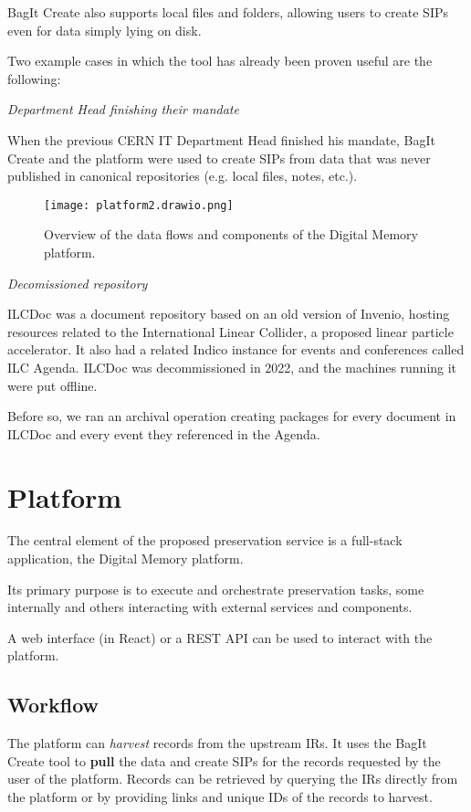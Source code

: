 \documentclass[11pt]{IEEEtran}
\begin{document}
BagIt Create also supports local files and folders, allowing users to create SIPs even for data simply lying on disk.

Two example cases in which the tool has already been proven useful are the following:

\par{\textit{Department Head finishing their mandate}}

When the previous CERN IT Department Head finished his mandate, BagIt Create and the platform were used to create SIPs from data that was never published in canonical repositories (e.g. local files, notes, etc.).

\begin{figure*}
    \texttt{[image: platform2.drawio.png]}
    \caption{Overview of the data flows and components of the Digital Memory platform.}
\end{figure*}

\par{\textit{Decomissioned repository}}

ILCDoc was a document repository based on an old version of Invenio, hosting resources related to the International Linear Collider, a proposed linear particle accelerator. It also had a related Indico instance for events and conferences called ILC Agenda.
ILCDoc was decommissioned in 2022, and the machines running it were put offline.

Before so, we ran an archival operation creating packages for every document in ILCDoc and every event they referenced in the Agenda.


\section{Platform}

The central element of the proposed preservation service is a full-stack application, the Digital Memory platform.

Its primary purpose is to execute and orchestrate preservation tasks, some internally and others interacting with external services and components.

A web interface (in React) or a REST API can be used to interact with the platform.


\subsection{Workflow}


The platform can \textit{harvest} records from the upstream IRs. It uses the BagIt Create tool to \textbf{pull} the data and create SIPs for the records requested by the user of the platform. Records can be retrieved by querying the IRs directly from the platform or by providing links and unique IDs of the records to harvest.
\end{document}
